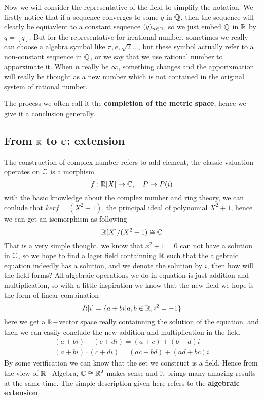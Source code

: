 \documentclass[en,geye,blue,pc,12pt]{elegantnote}
\begin{document}
Now we will consider the representative of the field to simplify the notation. We firstly notice that if a sequence converges to some \(q\) in \(\mathbb{Q} \), then the sequence will clearly be equiavlent to a constant sequence \((q)_{n \in \mathbb{N}}\), so we just embed \(\mathbb{Q}\) in \(\mathbb{R}\) by \(q = [q]\). But for the representative for irrational number, sometimes we really can choose a algebra symbol like \(\pi, e, \sqrt{2}\dots\), but these symbol actually refer to a non-constant sequence in \(\mathbb{Q}\), or we say that we use rational number to apporximate it. When \(n\) really be \(\infty\), something changes and the apporixmation will really be  thought as a new number which is not contained in the original system of rational number.

The process we often call it the \textbf{completion of the metric space}, hence we give it a conclusion generally.


\subsection{From \texorpdfstring{$\mathbb{R}$}{TEXT} to \texorpdfstring{$\mathbb{C}$}{TEXT}: extension}

The construction of complex number refers to add element, the classic valuation operates on \(\mathbb{C}\) is a morphism\[f: \mathbb{R}[X] \to \mathbb{C}, \quad P \mapsto P(i)\]
with the basic knowledge about the complex number and ring theory, we can conlude that \(kerf = (X^2+1)\), the principal ideal of polynomial \(X^2+1\), hence we can get an isomorphism as following
\[\mathbb{R}[X] / (X^2+1) \cong  \mathbb{C} \]
That is a very simple thought. we know that \(x^2+1 = 0\) can not have a solution in \(\mathbb{C}\), so we hope to find a lager field containning \(\mathbb{R}\) such that the algebraic equation indeedly has a solution, and we denote the solution by \(i\), then how will the field forms? All algebraic operations we do in equation is just addition and multiplication, so with a little inspiration we know that the new field we hope is the form of linear combination
\[R[i] = \{a+bi | a,b \in \mathbb{R}, i^2 = -1\}\]
here we get a \(\mathbb{R}-\)vector space really containning the solution of the equation. and then we can easily conclude the new addition and multiplication in the field
\begin{align*}
  (a+bi) + (c+di) = (a+c)+(b+d)i \\
  (a+bi) \cdot (c+di) =  (ac-bd)+(ad+bc)i
\end{align*}
By some verification we can know that the set we construct is a field. Hence from the view of \(\mathbb{R}-\)Algebra, \(\mathbb{C} \cong \mathbb{R}^2\) makes sense and it brings many amazing results at the same time. The simple description given here refers to the \textbf{algebraic extension},
\end{document}
